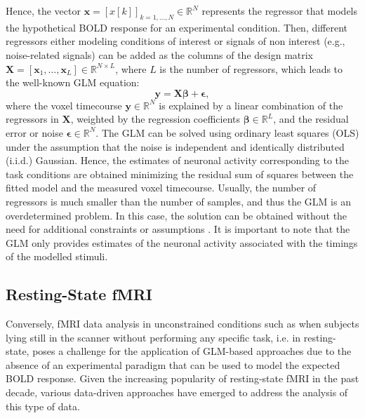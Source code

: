 Hence, the vector $\mathbf{x} = \left[x\left[k\right]\right]_{k=1,\dots,N} \in
\mathbb{R}^N $ represents the regressor that models the hypothetical BOLD
response for an experimental condition. Then, different regressors either
modeling conditions of interest or signals of non interest (e.g., noise-related
signals) can be added as the columns of the design matrix $\mathbf{X} =
\left[\mathbf{x}_1, \dots, \mathbf{x}_L\right] \in \mathbb{R}^{N\times L}$,
where $L$ is the number of regressors, which leads to the well-known
GLM equation:
\begin{equation}
    \mathbf{y} = \mathbf{X} \mathbf{\beta} + \mathbf{\epsilon},
\end{equation}
where the voxel timecourse $\mathbf{y} \in \mathbb{R}^N$ is explained by a
linear combination of the regressors in $\mathbf{X}$, weighted by the regression
coefficients $\mathbf{\beta} \in \mathbb{R}^L$, and the residual error or noise
$\mathbf{\epsilon} \in \mathbb{R}^N$. The GLM can be solved using ordinary least
squares (OLS) under the assumption that the noise is independent and identically
distributed (i.i.d.) Gaussian. Hence, the estimates of neuronal activity
corresponding to the task conditions are obtained minimizing the residual sum of
squares between the fitted model and the measured voxel timecourse. Usually, the
number of regressors is much smaller than the number of samples, and thus the
GLM is an overdetermined problem. In this case, the solution can be obtained
without the need for additional constraints or assumptions
\citep{Henson2007CHAPTER14Convolution}. It is important to note that the GLM
only provides estimates of the neuronal activity associated with the timings of
the modelled stimuli.

\subsection{Resting-State fMRI}

Conversely, fMRI data analysis in unconstrained conditions such as when subjects
lying still in the scanner without performing any specific task, i.e. in
resting-state, poses a challenge for the application of GLM-based approaches due
to the absence of an experimental paradigm that can be used to model the
expected BOLD response. Given the increasing popularity of resting-state fMRI in
the past decade, various data-driven approaches have emerged to address the
analysis of this type of data. 

